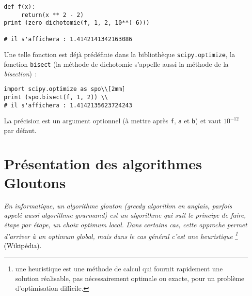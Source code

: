 \begin{lstlisting}
def f(x):
     return(x ** 2 - 2)
print (zero dichotomie(f, 1, 2, 10**(-6)))

# il s'affichera : 1.4142141342163086
\end{lstlisting}
%
% 

Une telle fonction est déjà prédéfinie dans la bibliothèque \texttt{scipy.optimize}, la fonction \texttt{bisect} \linebreak (la méthode de dichotomie s'appelle aussi la méthode de la \textit{bisection}) : 
\begin{lstlisting}
import scipy.optimize as spo\\[2mm]
print (spo.bisect(f, 1, 2)) \\
# il s'affichera : 1.4142135623724243
\end{lstlisting}
La précision est un argument optionnel (à mettre après \texttt{f}, \texttt{a} et \texttt{b}) et vaut $10^{-12}$ par défaut.



\section{Présentation des algorithmes Gloutons}

\textit{
En informatique, un algorithme glouton (greedy algorithm en anglais, parfois appelé aussi algorithme gourmand) est un algorithme qui suit le principe de faire, étape par étape, un choix optimum local. Dans certains cas, cette approche permet d'arriver à un optimum global, mais dans le cas général c'est une heuristique \footnote{une heuristique est une méthode de calcul qui fournit rapidement une solution réalisable, pas nécessairement optimale ou exacte, pour un problème d'optimisation difficile.}} (Wikipédia).\\

